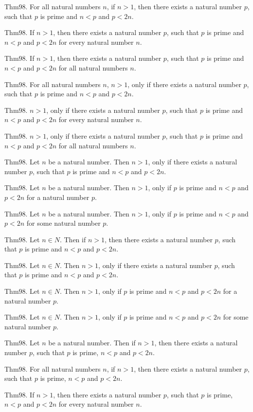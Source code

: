 \documentclass{article}
\begin{document}
Thm98. For all natural numbers $n$, if $n > 1$, then there exists a natural number $p$, such that $p$ is prime and $n < p$ and $p < 2 n$.

Thm98. If $n > 1$, then there exists a natural number $p$, such that $p$ is prime and $n < p$ and $p < 2 n$ for every natural number $n$.

Thm98. If $n > 1$, then there exists a natural number $p$, such that $p$ is prime and $n < p$ and $p < 2 n$ for all natural numbers $n$.

Thm98. For all natural numbers $n$, $n > 1$, only if there exists a natural number $p$, such that $p$ is prime and $n < p$ and $p < 2 n$.

Thm98. $n > 1$, only if there exists a natural number $p$, such that $p$ is prime and $n < p$ and $p < 2 n$ for every natural number $n$.

Thm98. $n > 1$, only if there exists a natural number $p$, such that $p$ is prime and $n < p$ and $p < 2 n$ for all natural numbers $n$.

Thm98. Let $n$ be a natural number. Then $n > 1$, only if there exists a natural number $p$, such that $p$ is prime and $n < p$ and $p < 2 n$.

Thm98. Let $n$ be a natural number. Then $n > 1$, only if $p$ is prime and $n < p$ and $p < 2 n$ for a natural number $p$.

Thm98. Let $n$ be a natural number. Then $n > 1$, only if $p$ is prime and $n < p$ and $p < 2 n$ for some natural number $p$.

Thm98. Let $n \in N$. Then if $n > 1$, then there exists a natural number $p$, such that $p$ is prime and $n < p$ and $p < 2 n$.

Thm98. Let $n \in N$. Then $n > 1$, only if there exists a natural number $p$, such that $p$ is prime and $n < p$ and $p < 2 n$.

Thm98. Let $n \in N$. Then $n > 1$, only if $p$ is prime and $n < p$ and $p < 2 n$ for a natural number $p$.

Thm98. Let $n \in N$. Then $n > 1$, only if $p$ is prime and $n < p$ and $p < 2 n$ for some natural number $p$.

Thm98. Let $n$ be a natural number. Then if $n > 1$, then there exists a natural number $p$, such that $p$ is prime, $n < p$ and $p < 2 n$.

Thm98. For all natural numbers $n$, if $n > 1$, then there exists a natural number $p$, such that $p$ is prime, $n < p$ and $p < 2 n$.

Thm98. If $n > 1$, then there exists a natural number $p$, such that $p$ is prime, $n < p$ and $p < 2 n$ for every natural number $n$.
\end{document}
